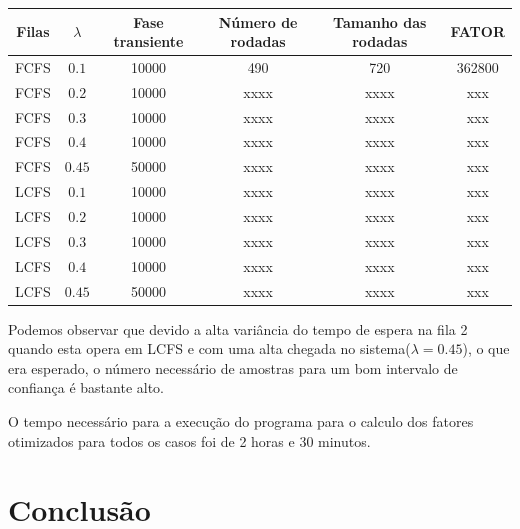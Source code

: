 \documentclass[a4paper,10pt]{article}
\begin{document}
\begin{center}
\begin{tabular} { | c | c | c | c | c | c | }
    \hline
    Filas & $\lambda$  & Fase transiente  & Número de rodadas & Tamanho das rodadas  & FATOR \\ \hline
    FCFS     & $0.1$   & 10000 & 490     & 720      & 362800       \\ \hline
    FCFS     & $0.2$   & 10000 & xxxx   & xxxx    & xxx             \\ \hline
    FCFS     & $0.3$   & 10000 & xxxx   & xxxx    & xxx             \\ \hline
    FCFS     & $0.4$   & 10000 & xxxx   & xxxx    & xxx             \\ \hline
    FCFS     & $0.45$ & 50000 & xxxx   & xxxx    & xxx             \\ \hline
    LCFS     & $0.1$   & 10000 & xxxx   & xxxx    & xxx             \\ \hline
    LCFS     & $0.2$   & 10000 & xxxx   & xxxx    & xxx             \\ \hline
    LCFS     & $0.3$   & 10000 & xxxx   & xxxx    & xxx             \\ \hline
    LCFS     & $0.4$   & 10000 & xxxx   & xxxx    & xxx             \\ \hline
    LCFS     & $0.45$ & 50000 & xxxx   & xxxx    & xxx             \\ \hline
\end{tabular}
\end{center}

Podemos observar que devido a alta variância do tempo de espera na fila 2 quando esta opera em LCFS e com uma alta chegada no sistema($\lambda = 0.45$), o que era esperado, o número necessário de amostras para um bom intervalo de confiança é bastante alto.

O tempo necessário para a execução do programa para o calculo dos fatores otimizados para todos os casos foi de 2 horas e 30 minutos.

\pagebreak

\section{Conclusão}
\pagebreak
\end{document}
